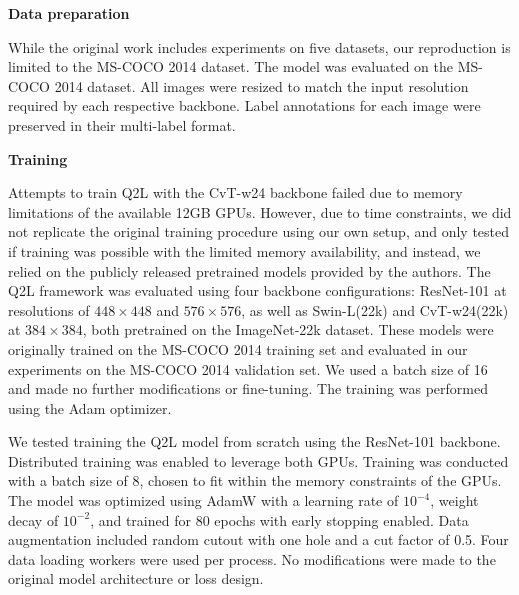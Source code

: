 \documentclass[lettersize,journal]{IEEEtran}
\renewcommand{\paragraph}[1]{%
  \vspace{1.5ex}\textbf{#1}\quad
}
\begin{document}
\paragraph{Data preparation}
While the original work includes experiments on five datasets, our reproduction is limited to the MS-COCO 2014 dataset. The model was evaluated on the MS-COCO 2014 dataset. All images were resized to match the input resolution required by each respective backbone. Label annotations for each image were preserved in their multi-label format.

\paragraph{Training}
Attempts to train Q2L with the CvT-w24 backbone failed due to memory limitations of the available 12GB GPUs. However, due to time constraints, we did not replicate the original training procedure using our own setup, and only tested if training was possible with the limited memory availability, and instead, we relied on the publicly released pretrained models provided by the authors. The Q2L framework was evaluated using four backbone configurations: ResNet-101 at resolutions of $448\times448$ and $576\times576$, as well as Swin-L(22k) and CvT-w24(22k) at $384\times384$, both pretrained on the ImageNet-22k \cite{imagenet} dataset. These models were originally trained on the MS-COCO 2014 training set and evaluated in our experiments on the MS-COCO 2014 validation set. We used a batch size of 16 and made no further modifications or fine-tuning. The training was performed using the Adam optimizer. 


We tested training the Q2L model from scratch using the ResNet-101 backbone. Distributed training was enabled to leverage both GPUs. Training was conducted with a batch size of 8, chosen to fit within the memory constraints of the GPUs. The model was optimized using AdamW with a learning rate of $10^{-4}$, weight decay of $10^{-2}$, and trained for 80 epochs with early stopping enabled. Data augmentation included random cutout with one hole and a cut factor of 0.5. Four data loading workers were used per process. No modifications were made to the original model architecture or loss design.
\end{document}
